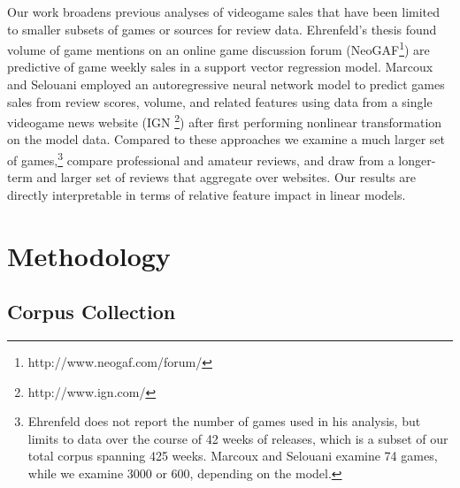 \documentclass[letterpaper]{article}
\begin{document}
Our work broadens previous analyses of videogame sales that have been limited to smaller subsets of games or sources for review data. Ehrenfeld's thesis found volume of game mentions on an online game discussion forum (NeoGAF\footnote{http://www.neogaf.com/forum/}) are predictive of game weekly sales in a support vector regression model. Marcoux and Selouani employed an autoregressive neural network model to predict games sales from review scores, volume, and related features using data from a single videogame news website (IGN \footnote{http://www.ign.com/}) after first performing nonlinear transformation on the model data. Compared to these approaches we examine a much larger set of games,\footnote{Ehrenfeld does not report the number of games used in his analysis, but limits to data over the course of 42 weeks of releases, which is a subset of our total corpus spanning 425 weeks. Marcoux and Selouani examine 74 games, while we examine 3000 or 600, depending on the model.} compare professional and amateur reviews, and draw from a longer-term and larger set of reviews that aggregate over websites. Our results are directly interpretable in terms of relative feature impact in linear models.


\section{Methodology}

\subsection{Corpus Collection}
\end{document}
